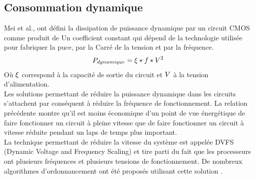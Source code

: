 \subsection{Consommation dynamique}
\vspace{-1cm}
Mei et al.\cite{Mei13}, ont défini la dissipation de puissance dynamique par un circuit CMOS comme produit de
Un coefficient constant qui dépend de la technologie utilisée pour fabriquer la puce, par la
Carré de la tension et par la fréquence.
\begin{equation}
\pow_{dynamique} = \coeff * \freq * \volt^2 
\end{equation}
Où $\coeff$ correspond à la capacité de sortie du circuit et $\volt$ à la tension d’alimentation. 	
\\ \indent Les solutions permettant de réduire la puissance dynamique dans les circuits s’attachent par conséquent à réduire la fréquence de fonctionnement. La relation précédente montre qu’il est moins économique d’un point de vue énergétique de faire fonctionner un circuit à pleine vitesse que de faire fonctionner un circuit à vitesse réduite pendant un laps de temps plus important.
\\ \indent La technique permettant de réduire la vitesse du système est appelée DVFS (Dynamic Voltage and Frequency Scaling) et tire parti du fait que les processeurs ont plusieurs fréquences et plusieurs tensions de fonctionnement. De nombreux algorithmes d’ordonnancement ont été proposés utilisant cette solution \cite{WWDS94, YDS95, PS01}.
